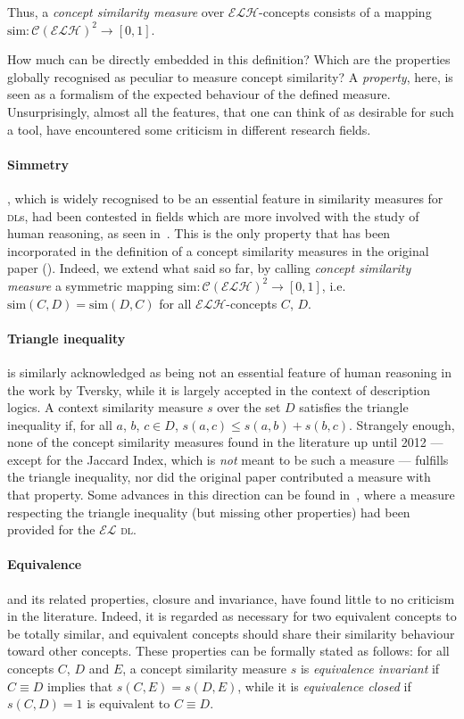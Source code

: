 \documentclass[]{llncs}
\newcommand{\el}{\(\mathcal{EL}{}\)}
\newcommand{\elh}{\(\mathcal{ELH}{}\)}
\newcommand{\dl}{\textsc{dl}}
\begin{document}
  Thus, a \emph{concept similarity measure} over \elh-concepts consists of a mapping \(\mathrm{sim} \colon {\mathcal{C}(\mathcal{ELH})}^2 \to [0,1]\).

  How much can be directly embedded in this definition?
  Which are the properties globally recognised as peculiar to measure concept similarity?
  A \emph{property}, here, is seen as a formalism of the expected behaviour of the defined measure.
  Unsurprisingly, almost all the features, that one can think of as desirable for such a tool, have encountered some criticism in different research fields.

  \paragraph{Simmetry}, which is widely recognised to be an essential feature in similarity measures for \dl{}s, had been contested in fields which are more involved with the study of human reasoning, as seen in~\cite{Tve77}.
  This is the only property that has been incorporated in the definition of a concept similarity measures in the original paper (\cite{LeTu12}).
  Indeed, we extend what said so far, by calling \emph{concept similarity measure} a symmetric mapping \(\mathrm{sim} \colon {\mathcal{C}(\mathcal{ELH})}^2 \to [0,1]\), i.e. \(\mathrm{sim}(C,D) = \mathrm{sim}(D,C)\) for all \elh-concepts \(C\), \(D\).

  \paragraph{Triangle inequality} is similarly acknowledged as being not an essential feature of human reasoning in the work by Tversky, while it is largely accepted in the context of description logics.
  A context similarity measure \(s\) over the set \(D\) satisfies the triangle inequality if, for all \(a\), \(b\), \(c \in D\),
  \(s(a,c) \le s(a,b) + s(b,c)\).
  Strangely enough, none of the concept similarity measures found in the literature up until 2012 --- except for the Jaccard Index, which is \emph{not} meant to be such a measure --- fulfills the triangle inequality, nor did the original paper contributed a measure with that property.
  Some advances in this direction can be found in~\cite{DAB14}, where a measure respecting the triangle inequality (but missing other properties) had been provided for the \el{} \dl.

  \paragraph{Equivalence} and its related properties, closure and invariance, have found little to no criticism in the literature.
  Indeed, it is regarded as necessary for two equivalent concepts to be totally similar, and equivalent concepts should share their similarity behaviour toward other concepts.
  These properties can be formally stated as follows: for all concepts \(C\), \(D\) and \(E\), a concept similarity measure \(s\) is \emph{equivalence invariant} if \(C \equiv D\) implies that \(s(C,E) = s(D,E)\), while it is \emph{equivalence closed} if \(s(C,D) = 1\) is equivalent to \(C \equiv D\).
\end{document}
